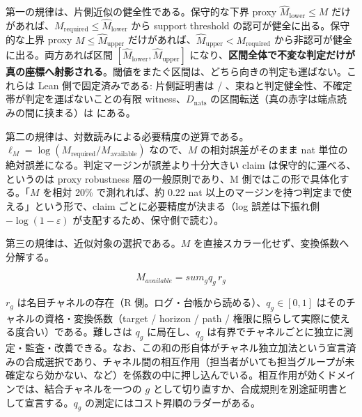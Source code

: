 \documentclass[12pt,a4paper]{article}
\begin{document}
第一の規律は、片側近似の健全性である。保守的な下界 proxy \(\hat M_{\mathrm{lower}} \le M\) だけがあれば、\(M_{\mathrm{required}} \le \hat M_{\mathrm{lower}}\) から support threshold の認可が健全に出る。保守的な上界 proxy \(M \le \hat M_{\mathrm{upper}}\) だけがあれば、\(\hat M_{\mathrm{upper}} < M_{\mathrm{required}}\) から非認可が健全に出る。両方あれば区間 \([\hat M_{\mathrm{lower}}, \hat M_{\mathrm{upper}}]\) になり、\textbf{区間全体で不変な判定だけが真の座標へ射影される}。閾値をまたぐ区間は、どちら向きの判定も運ばない。これらは Lean 側で固定済みである: 片側証明書は {\scriptsize{}} / {\scriptsize{}}、束ねと判定健全性、不確定帯が判定を運ばないことの有限 witness、\(D_{\mathrm{nats}}\) の区間転送（真の赤字は端点読みの間に挟まる）は {\scriptsize{}} にある。

第二の規律は、対数読みによる必要精度の逆算である。\(\ell_M = \log(M_{\mathrm{required}}/M_{\mathrm{available}})\) なので、\(M\) の相対誤差がそのまま nat 単位の絶対誤差になる。判定マージンが誤差より十分大きい claim は保守的に運べる、というのは proxy robustness 層の一般原則であり、M 側ではこの形で具体化する。「\(M\) を相対 20\% で測れれば、約 0.22 nat 以上のマージンを持つ判定まで使える」という形で、claim ごとに必要精度が決まる（log 誤差は下振れ側 \(-\log(1-\varepsilon)\) が支配するため、保守側で読む）。

第三の規律は、近似対象の選択である。\(M\) を直接スカラー化せず、変換係数へ分解する。

\[
M_{available} = sum_g q_{g} \, r_{g}
\]

\(r_g\) は名目チャネルの存在（R 側。ログ・台帳から読める）、\(q_g \in [0,1]\) はそのチャネルの資格・変換係数（target / horizon / path / 権限に照らして実際に使える度合い）である。難しさは \(q_g\) に局在し、\(q_g\) は有界でチャネルごとに独立に測定・監査・改善できる。なお、この和の形自体がチャネル独立加法という宣言済みの合成選択であり、チャネル間の相互作用（担当者がいても担当グループが未確定なら効かない、など）を係数の中に押し込んでいる。相互作用が効くドメインでは、結合チャネルを一つの \(g\) として切り直すか、合成規則を別途証明書として宣言する。\(q_g\) の測定にはコスト昇順のラダーがある。
\end{document}
